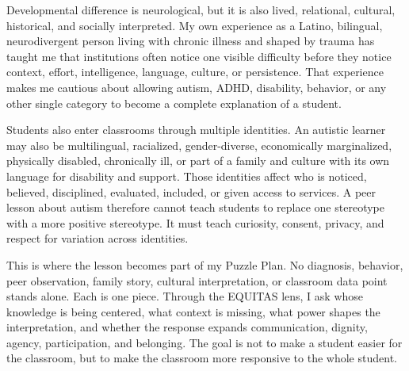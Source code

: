 
Developmental difference is neurological, but it is also lived, relational, cultural, historical, and socially interpreted. My own experience as a Latino, bilingual, neurodivergent person living with chronic illness and shaped by trauma has taught me that institutions often notice one visible difficulty before they notice context, effort, intelligence, language, culture, or persistence. That experience makes me cautious about allowing autism, ADHD, disability, behavior, or any other single category to become a complete explanation of a student.

Students also enter classrooms through multiple identities. An autistic learner may also be multilingual, racialized, gender-diverse, economically marginalized, physically disabled, chronically ill, or part of a family and culture with its own language for disability and support. Those identities affect who is noticed, believed, disciplined, evaluated, included, or given access to services. A peer lesson about autism therefore cannot teach students to replace one stereotype with a more positive stereotype. It must teach curiosity, consent, privacy, and respect for variation across identities.

This is where the lesson becomes part of my Puzzle Plan. No diagnosis, behavior, peer observation, family story, cultural interpretation, or classroom data point stands alone. Each is one piece. Through the EQUITAS lens, I ask whose knowledge is being centered, what context is missing, what power shapes the interpretation, and whether the response expands communication, dignity, agency, participation, and belonging. The goal is not to make a student easier for the classroom, but to make the classroom more responsive to the whole student.
